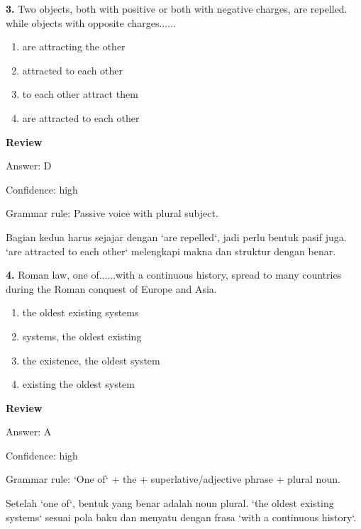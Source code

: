 \documentclass[12pt]{article}
\begin{document}
\noindent\textbf{3.} Two objects, both with positive or both with negative charges, are repelled. while objects with opposite charges......
\begin{enumerate}[label=(\Alph*),leftmargin=*,itemsep=0.2em]
\item are attracting the other
\item attracted to each other
\item to each other attract them
\item are attracted to each other
\end{enumerate}
\par
\begingroup
\setlength{\parskip}{0pt}
\setlength{\parindent}{0pt}
\textbf{Review}\par
Answer: D\par
Confidence: high\par
Grammar rule: Passive voice with plural subject.\par
Bagian kedua harus sejajar dengan `are repelled`, jadi perlu bentuk pasif juga. `are attracted to each other` melengkapi makna dan struktur dengan benar.\par
\endgroup
\par
\vspace{0.25\baselineskip}
\noindent\textbf{4.} Roman law, one of......with a continuous history, spread to many countries during the Roman conquest of Europe and Asia.
\begin{enumerate}[label=(\Alph*),leftmargin=*,itemsep=0.2em]
\item the oldest existing systems
\item systems, the oldest existing
\item the existence, the oldest system
\item existing the oldest system
\end{enumerate}
\par
\begingroup
\setlength{\parskip}{0pt}
\setlength{\parindent}{0pt}
\textbf{Review}\par
Answer: A\par
Confidence: high\par
Grammar rule: `One of` + the + superlative/adjective phrase + plural noun.\par
Setelah `one of`, bentuk yang benar adalah noun plural. `the oldest existing systems` sesuai pola baku dan menyatu dengan frasa `with a continuous history`.\par
\endgroup
\par
\vspace{0.25\baselineskip}
\end{document}
